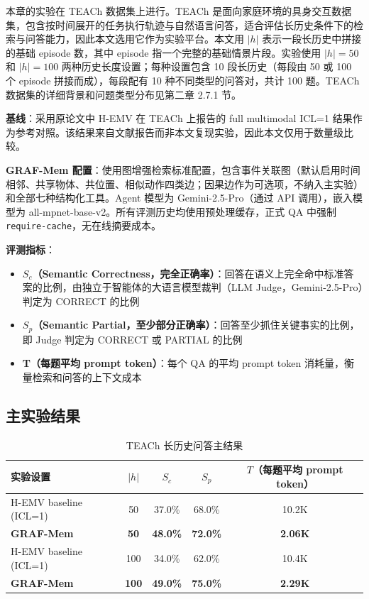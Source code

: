 本章的实验在 TEACh 数据集上进行。TEACh 是面向家庭环境的具身交互数据集，包含按时间展开的任务执行轨迹与自然语言问答，适合评估长历史条件下的检索与问答能力，因此本文选用它作为实验平台。本文用 $|h|$ 表示一段长历史中拼接的基础 episode 数，其中 episode 指一个完整的基础情景片段。实验使用 $|h|=50$ 和 $|h|=100$ 两种历史长度设置；每种设置包含 10 段长历史（每段由 50 或 100 个 episode 拼接而成），每段配有 10 种不同类型的问答对，共计 100 题。TEACh 数据集的详细背景和问题类型分布见第二章 2.7.1 节。

\textbf{基线}：采用原论文中 H-EMV 在 TEACh 上报告的 full multimodal ICL=1 结果作为参考对照。该结果来自文献报告而非本文复现实验，因此本文仅用于数量级比较。

\textbf{GRAF-Mem 配置}：使用图增强检索标准配置，包含事件关联图（默认启用时间相邻、共享物体、共位置、相似动作四类边；因果边作为可选项，不纳入主实验）和全部七种结构化工具。Agent 模型为 Gemini-2.5-Pro（通过 API 调用），嵌入模型为 all-mpnet-base-v2。所有评测历史均使用预处理缓存，正式 QA 中强制 \texttt{require-cache}，无在线摘要成本。

\textbf{评测指标}：
\begin{itemize}
\item \textbf{$S_c$（Semantic Correctness，完全正确率）}：回答在语义上完全命中标准答案的比例，由独立于智能体的大语言模型裁判（LLM Judge，Gemini-2.5-Pro）判定为 CORRECT 的比例
\item \textbf{$S_p$（Semantic Partial，至少部分正确率）}：回答至少抓住关键事实的比例，即 Judge 判定为 CORRECT 或 PARTIAL 的比例
\item \textbf{T（每题平均 prompt token）}：每个 QA 的平均 prompt token 消耗量，衡量检索和问答的上下文成本
\end{itemize}

\subsection{主实验结果}

\begin{table}[htbp]
\centering
\caption{TEACh 长历史问答主结果}
\label{tab:3-1}
\begin{tabular}{lcccc}
\toprule
实验设置 & $|h|$ & $S_c$ & $S_p$ & $T$（每题平均 prompt token） \\
\midrule
H-EMV baseline (ICL=1) & 50 & 37.0\% & 68.0\% & 10.2K \\
\textbf{GRAF-Mem} & \textbf{50} & \textbf{48.0\%} & \textbf{72.0\%} & \textbf{2.06K} \\
H-EMV baseline (ICL=1) & 100 & 34.0\% & 62.0\% & 10.4K \\
\textbf{GRAF-Mem} & \textbf{100} & \textbf{49.0\%} & \textbf{75.0\%} & \textbf{2.29K} \\
\bottomrule
\end{tabular}
\end{table}

